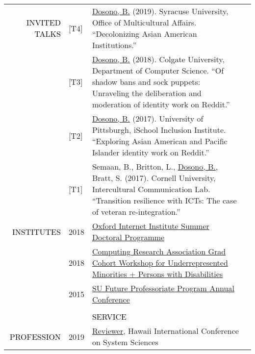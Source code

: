 \documentclass[12pt]{article}
\begin{document}
{{\begin{longtable}{Rp{1.0in}p{0.25in}p{4.75in}}
\textcolor{black}{\footnotesize{\uppercase{Invited Talks}}} & \footnotesize{[T4]} & \href{https://news.syr.edu/blog/2019/03/22/celebrate-asian-american-and-pacific-islander-heritage-month-this-april/}{{Dosono, B.}} (2019). Syracuse University, Office of Multicultural Affairs. ``Decolonizing Asian American Institutions.'' \\

& \footnotesize{[T3]} & \href{https://cs.colgate.edu/cs/events/151/}{{Dosono, B.}} (2018). Colgate University, Department of Computer Science. ``Of shadow bans and sock puppets: Unraveling the deliberation and moderation of identity work on Reddit.'' \\

& \footnotesize{[T2]} & \href{http://www.sis.pitt.edu/i3/i3-cohorts/2017/schedule.html}{{Dosono, B.}} (2017). University of Pittsburgh, iSchool Inclusion Institute. ``Exploring Asian American and Pacific Islander identity work on Reddit.'' \\

& \footnotesize{[T1]} & Semaan, B., Britton, L., \href{http://bit.ly/CornellTalk}{{Dosono, B.}}, Bratt, S. (2017). Cornell University, Intercultural Communication Lab. ``Transition resilience with ICTs: The case of veteran re-integration.'' \\

\textcolor{black}{\footnotesize{\uppercase{Institutes}}} & \footnotesize{2018} & \href{https://www.oii.ox.ac.uk/study/summer-doctoral-programme/alumni/}{{Oxford Internet Institute Summer Doctoral Programme}} \\

& \footnotesize{2018} & \href{https://cra.org/events/urmgradcohort/}{{Computing Research Association Grad Cohort Workshop for Underrepresented Minorities + Persons with Disabilities}} \\

& \footnotesize{2015} & \href{http://graduateschool.syr.edu/programs/future-professoriate-program/}{{SU Future Professoriate Program Annual Conference}}
\\
\\
&&\par \Large \textcolor{black}{\uppercase{Service}}\\ \hhline{~~-}
\textcolor{black}{\footnotesize{\uppercase{Profession}}} 
& \footnotesize{2019} & \href{https://hicss.hawaii.edu/}{{Reviewer}}, Hawaii International Conference on System Sciences \\


\end{longtable}}}
\end{document}
